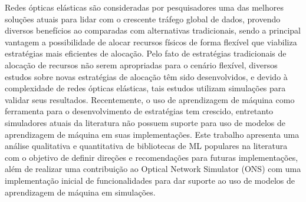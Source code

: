 Redes ópticas elásticas são consideradas por pesquisadores uma das melhores soluções atuais para lidar com o crescente tráfego global de dados, provendo diversos benefícios ao comparadas com alternativas tradicionais, sendo a principal vantagem a possibilidade de alocar recursos físicos de forma flexível que viabiliza estratégias mais eficientes de alocação. Pelo fato de estratégias tradicionais de alocação de recursos não serem apropriadas para o cenário flexível, diversos estudos sobre novas estratégias de alocação têm sido desenvolvidos, e devido à complexidade de redes ópticas elásticas, tais estudos utilizam simulações para validar seus resultados. Recentemente, o uso de aprendizagem de máquina como ferramenta para o desenvolvimento de estratégias tem crescido, entretanto simuladores atuais da literatura não possuem suporte para uso de modelos de aprendizagem de máquina em suas implementações. Este trabalho apresenta uma análise qualitativa e quantitativa de bibliotecas de ML populares na literatura com o objetivo de definir direções e recomendações para futuras implementações, além de realizar uma contribuição ao Optical Network Simulator (ONS) com uma implementação inicial de funcionalidades para dar suporte ao uso de modelos de aprendizagem de máquina em simulações.